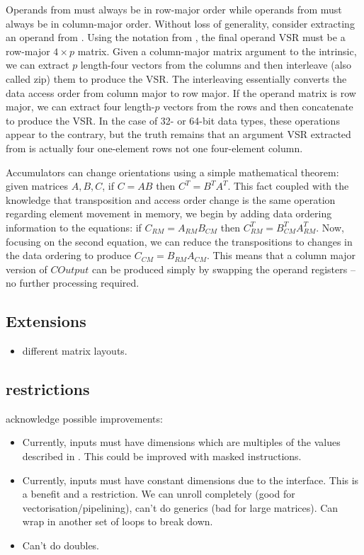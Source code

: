 \documentclass[\main/thesis.tex]{subfiles}
\begin{document}
Operands from  must always be in row-major order while operands from  must always be in column-major order.
Without loss of generality, consider extracting an operand from .
Using the notation from , the final operand VSR must be a row-major $4 \times p$ matrix.
Given a column-major matrix argument to the intrinsic, we can extract $p$ length-four vectors from the columns and then interleave (also called zip) them to produce the VSR.
The interleaving essentially converts the data access order from column major to row major.
If the operand matrix is row major, we can extract four length-$p$ vectors from the rows and then concatenate to produce the VSR.
In the case of 32- or 64-bit data types, these operations appear to the contrary, but the truth remains that an argument VSR extracted from  is actually four one-element rows not one four-element column.

Accumulators can change orientations using a simple mathematical theorem: given matrices $A, B, C$, if $C = AB$ then $C^T=B^TA^T$.
This fact coupled with the knowledge that transposition and access order change is the same operation regarding element movement in memory, we begin by adding data ordering information to the equations: if $C_{RM}=A_{RM}B_{CM}$ then $C^T_{RM}=B^T_{CM}A^T_{RM}$.
Now, focusing on the second equation, we can reduce the transpositions to changes in the data ordering to produce $C_{CM}=B_{RM}A_{CM}$.
This means that a column major version of $COutput$ can be produced simply by swapping the operand registers -- no further processing required.

\subsection{Extensions}
\begin{itemize}
  \item different matrix layouts.
\end{itemize}

\subsection{restrictions}
\label{sec:restrictions}
acknowledge possible improvements:
\begin{itemize}
  \item Currently, inputs must have dimensions which are multiples of the values described in . This could be improved with masked instructions.
  \item Currently, inputs must have constant dimensions due to the interface. This is a benefit and a restriction. We can unroll completely (good for vectorisation/pipelining), can't do generics (bad for large matrices). Can wrap in another set of loops to break down.
  \item Can't do doubles.
\end{itemize}
\end{document}
